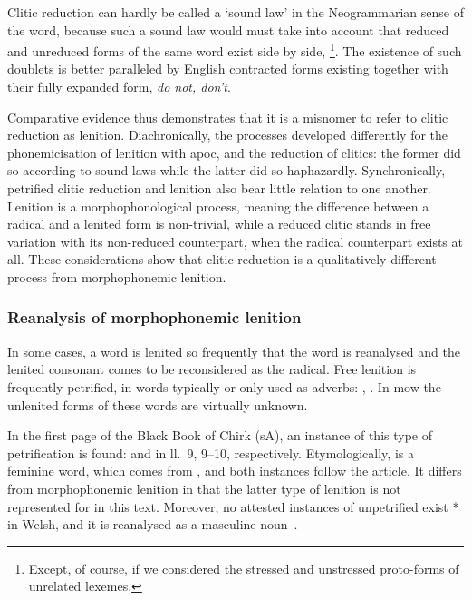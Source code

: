Clitic reduction can hardly be called a `sound law' in the Neogrammarian sense of the word, because such a sound law would must take into account that reduced and unreduced forms of the same word  exist side by side, \eg {}\footnote{%
  Except, of course, if we considered the stressed and unstressed proto-forms of  unrelated lexemes.
}.
The existence of such doublets is better paralleled by English contracted forms existing together with their fully expanded form, \eg \emph{do not, don't}.


Comparative evidence thus demonstrates that it is a misnomer to refer to clitic reduction as lenition.
Diachronically, the processes developed differently for the phonemicisation of lenition with \gls{apoc}, and the reduction of clitics: the former did so according to sound laws while the latter did so haphazardly.
Synchronically, petrified clitic reduction and lenition also bear little relation to one another. Lenition is a morphophonological process, meaning the difference between a radical and a lenited form is non-trivial, while a reduced clitic stands in free variation with its non-reduced counterpart, when the radical counterpart exists at all. 
These considerations show that clitic reduction is a qualitatively different process from morphophonemic lenition. 

\subsubsection{Reanalysis of morphophonemic lenition}
\label{sec:rean-morph-lenit}
In some cases,  a word is lenited so frequently that the word is reanalysed and the lenited consonant comes to be reconsidered as the radical.
Free lenition is frequently petrified, \eg in words typically or only used as adverbs: , . In \gls{mow} the unlenited forms of these words are virtually unknown.



In the first page of the Black Book of Chirk (\gls{sA}), an instance of this type of petrification is found:  and  in ll.~9, 9--10, respectively. 
Etymologically,  is a feminine word, which comes from , and both instances follow the article. 
It differs from morphophonemic lenition in that the latter type of lenition is not represented for  in this text. 
Moreover, no attested instances of unpetrified exist * in Welsh, and it is reanalysed as a masculine noun~\autocite[s.v.~]{bevan_geiriadur_2014}. 

